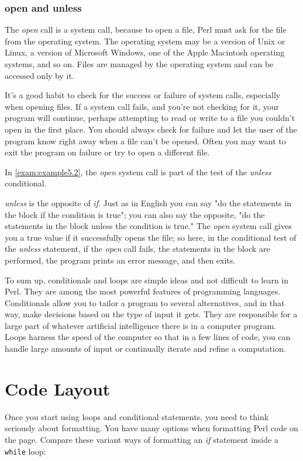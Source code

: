 \subsubsection{open and unless}
The \textit{open} call is a system call, because to open a file, Perl must ask for the file from the operating system. The operating system may be a version of Unix or Linux, a version of Microsoft Windows, one of the Apple Macintosh operating systems, and so on. Files are managed by the operating system and can be accessed only by it.

It's a good habit to check for the success or failure of system calls, especially when opening files. If a system call fails, and you're not checking for it, your program will continue, perhaps attempting to read or write to a file you couldn't open in the first place. You should always check for failure and let the user of the program know right away when a file can't be opened. Often you may want to exit the program on failure or try to open a different file.  

In \autoref{exam:example5.2}, the \textit{open} system call is part of the test of the \textit{unless} conditional.

\textit{unless} is the opposite of \textit{if}. Just as in English you can say "do the statements in the block if the condition is true"; you can also say the opposite, "do the statements in the block unless the condition is true." The \textit{open} system call gives you a true value if it successfully opens the file; so here, in the conditional test of the \textit{unless} statement, if the \textit{open} call fails, the statements in the block are performed, the program prints an error message, and then exits.

To sum up, conditionals and loops are simple ideas and not difficult to learn in Perl. They are among the most powerful features of programming languages. Conditionals allow you to tailor a program to several alternatives, and in that way, make decisions based on the type of input it gets. They are responsible for a large part of whatever artificial intelligence there is in a computer program. Loops harness the speed of the computer so that in a few lines of code, you can handle large amounts of input or continually iterate and refine a computation. 

\section{Code Layout}
\label{sect:section5.2}
Once you start using loops and conditional statements, you need to think seriously about formatting. You have many options when formatting Perl code on the page. Compare these variant ways of formatting an \textit{if} statement inside a \verb|while| loop:

